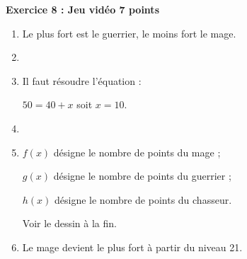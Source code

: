 \textbf{Exercice 8 : Jeu vidéo \hfill 7 points}

\bigskip
 
%
% 
%
%
%

\begin{enumerate}
\item %
Le plus fort est le guerrier, le moins fort le mage.
\item %
\item %
Il faut résoudre l'équation :

$50 = 40 + x$  soit $x = 10$.
\item %

% 
 
\item %
$f(x)$ désigne le nombre de points du mage ;

$g(x)$ désigne le nombre de points du guerrier ;

$h(x)$ désigne le nombre de points du chasseur.

Voir le dessin à la fin. 
\item %
Le mage devient le plus fort à partir du niveau 21. 
\end{enumerate} 

